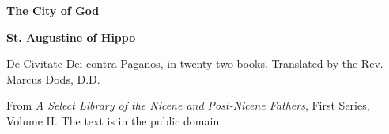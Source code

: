 \documentclass[11pt,letterpaper]{article}
\begin{document}
\color{ink}

\begin{titlepage}
\centering
\vspace*{4em}
{\LARGE\bfseries\color{heading} The City of God\par}
\vspace{2em}
{\Large\bfseries\color{heading} St. Augustine of Hippo\par}
\vspace{2.5em}
{\itshape\color{subhead}\parbox{0.8\linewidth}{\centering De Civitate Dei contra Paganos, in twenty-two books. Translated by the Rev. Marcus Dods, D.D.\par}}
\vfill
{\small From \emph{A Select Library of the Nicene and Post-Nicene Fathers}, First Series, Volume II. The text is in the public domain.\par}
\vspace{2em}
\end{titlepage}

\tableofcontents


\end{document}
